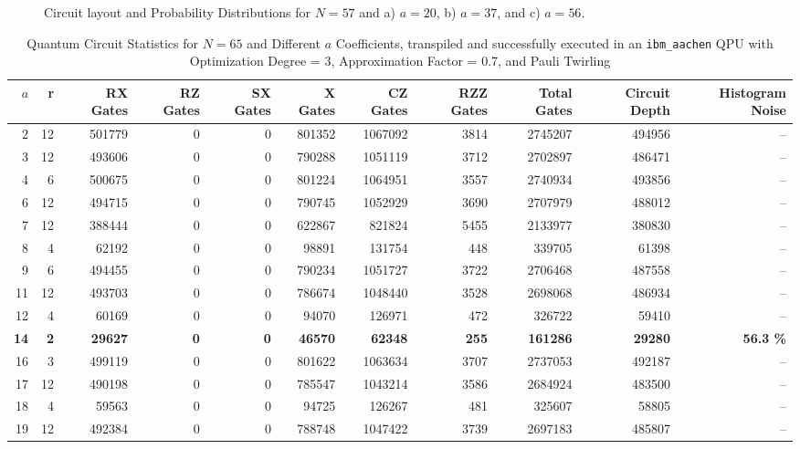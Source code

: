 \documentclass[conference,twoside]{IEEEtran}
\begin{document}
\begin{figure}[h]
\begin{tabular}{p{}}
\begin{minipage}{0.3\textwidth}
\end{minipage} \\
\bottomrule
\end{tabular}
\caption{Circuit layout and Probability Distributions for $N=57$ and a) $a=20$, b) $a=37$, and c) $a=56$.}
\label{tab:Factoring_N=57}
\end{figure}

\begin{table}[!htbp]
\centering
\caption{Quantum Circuit Statistics for $N=65$ and Different $a$ Coefficients, transpiled and successfully executed in an \texttt{ibm\_aachen} QPU with Optimization Degree = 3, Approximation Factor = 0.7, and Pauli Twirling}
\label{tab:QC_statistics_N=65_all_a}
\begin{tabular}{rrrrrrrrrrr}
\toprule
$a$ & r & RX Gates & RZ Gates & SX Gates & X Gates & CZ Gates & RZZ Gates & Total Gates & Circuit Depth & Histogram Noise\\
\midrule
2 &  12 & 501779 & 0 & 0 & 801352 & 1067092 & 3814 & 2745207 & 494956& -- \\
3 &  12 & 493606 & 0 & 0 & 790288 & 1051119 & 3712 & 2702897 & 486471& -- \\
4 &  6 & 500675 & 0 & 0 & 801224 & 1064951 & 3557 & 2740934 & 493856& -- \\
6 &  12 & 494715 & 0 & 0 & 790745 & 1052929 & 3690 & 2707979 & 488012& -- \\
7 &  12 & 388444 & 0 & 0 & 622867 & 821824 & 5455 & 2133977 & 380830& -- \\
8 &  4 & 62192 & 0 & 0 & 98891 & 131754 & 448 & 339705 & 61398& -- \\
9 &  6 & 494455 & 0 & 0 & 790234 & 1051727 & 3722 & 2706468 & 487558& -- \\
11 & 12  & 493703 & 0 & 0 & 786674 & 1048440 & 3528 & 2698068 & 486934& -- \\
12 &  4 & 60169 & 0 & 0 & 94070 & 126971 & 472 & 326722 & 59410& -- \\
\textbf{14} & \textbf{2}  & \textbf{29627} & \textbf{0} & \textbf{0} & \textbf{46570} & \textbf{62348} & \textbf{255} & \textbf{161286} & \textbf{29280} & \textbf{56.3 \%} \\
16 &  3 & 499119 & 0 & 0 & 801622 & 1063634 & 3707 & 2737053 & 492187& -- \\
17 &  12 & 490198 & 0 & 0 & 785547 & 1043214 & 3586 & 2684924 & 483500& -- \\
18 & 4  & 59563 & 0 & 0 & 94725 & 126267 & 481 & 325607 & 58805& -- \\
19 & 12  & 492384 & 0 & 0 & 788748 & 1047422 & 3739 & 2697183 & 485807& -- \\

\end{tabular}
\end{table}
\end{document}
